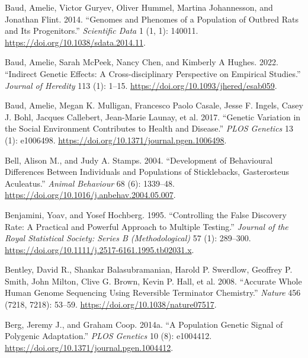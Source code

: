 \documentclass[
]{book}
\newlength{\cslhangindent}
\newlength{\cslentryspacingunit} %
\newenvironment{CSLReferences}[2] %
 {%
  \setlength{\parindent}{0pt}
  \ifodd #1
  \let\oldpar\par
  \def\par{\hangindent=\cslhangindent\oldpar}
  \fi
  \setlength{\parskip}{#2\cslentryspacingunit}
 }%
 {}
\begin{document}
\begin{CSLReferences}{1}{0}
\leavevmode{}%
Baud, Amelie, Victor Guryev, Oliver Hummel, Martina Johannesson, and Jonathan Flint. 2014. {``Genomes and Phenomes of a Population of Outbred Rats and Its Progenitors.''} \emph{Scientific Data} 1 (1, 1): 140011. \url{https://doi.org/10.1038/sdata.2014.11}.

\leavevmode{}%
Baud, Amelie, Sarah McPeek, Nancy Chen, and Kimberly A Hughes. 2022. {``Indirect {Genetic Effects}: {A Cross-disciplinary Perspective} on {Empirical Studies}.''} \emph{Journal of Heredity} 113 (1): 1--15. \url{https://doi.org/10.1093/jhered/esab059}.

\leavevmode{}%
Baud, Amelie, Megan K. Mulligan, Francesco Paolo Casale, Jesse F. Ingels, Casey J. Bohl, Jacques Callebert, Jean-Marie Launay, et al. 2017. {``Genetic {Variation} in the {Social Environment Contributes} to {Health} and {Disease}.''} \emph{PLOS Genetics} 13 (1): e1006498. \url{https://doi.org/10.1371/journal.pgen.1006498}.

\leavevmode{}%
Bell, Alison M., and Judy A. Stamps. 2004. {``Development of Behavioural Differences Between Individuals and Populations of Sticklebacks, {Gasterosteus} Aculeatus.''} \emph{Animal Behaviour} 68 (6): 1339--48. \url{https://doi.org/10.1016/j.anbehav.2004.05.007}.

\leavevmode{}%
Benjamini, Yoav, and Yosef Hochberg. 1995. {``Controlling the {False Discovery Rate}: {A Practical} and {Powerful Approach} to {Multiple Testing}.''} \emph{Journal of the Royal Statistical Society: Series B (Methodological)} 57 (1): 289--300. \url{https://doi.org/10.1111/j.2517-6161.1995.tb02031.x}.

\leavevmode{}%
Bentley, David R., Shankar Balasubramanian, Harold P. Swerdlow, Geoffrey P. Smith, John Milton, Clive G. Brown, Kevin P. Hall, et al. 2008. {``Accurate Whole Human Genome Sequencing Using Reversible Terminator Chemistry.''} \emph{Nature} 456 (7218, 7218): 53--59. \url{https://doi.org/10.1038/nature07517}.

\leavevmode{}%
Berg, Jeremy J., and Graham Coop. 2014a. {``A {Population Genetic Signal} of {Polygenic Adaptation}.''} \emph{PLOS Genetics} 10 (8): e1004412. \url{https://doi.org/10.1371/journal.pgen.1004412}.


\end{CSLReferences}
\end{document}
